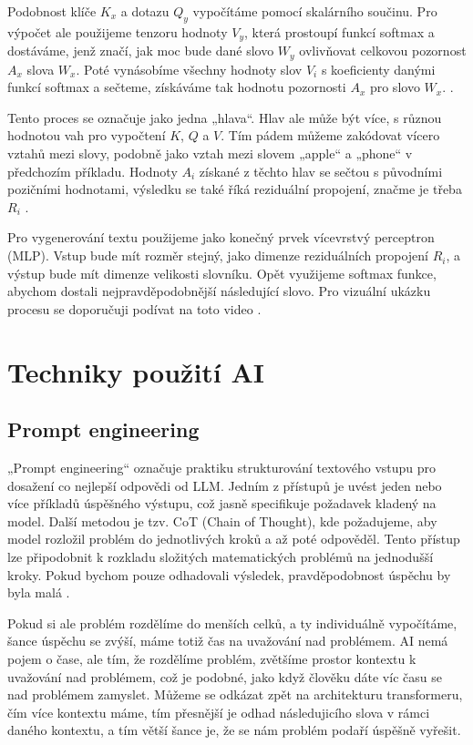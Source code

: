 \documentclass[FM,DP]{tulthesis}
\begin{document}
		Podobnost klíče $K_x$ a dotazu $Q_y$ vypočítáme pomocí skalárního součinu. Pro výpočet ale použijeme tenzoru hodnoty $V_y$, která prostoupí funkcí softmax a dostáváme, jenž značí, jak moc bude dané slovo $W_y$ ovlivňovat celkovou pozornost $A_x$ slova $W_x$. Poté vynásobíme všechny hodnoty slov $V_i$ s koeficienty danými funkcí softmax a sečteme, získáváme tak hodnotu pozornosti $A_x$ pro slovo $W_x$. \cite{vaswani2023attention} \cite{rothman2021transformers}.
		
		Tento proces se označuje jako jedna „hlava“. Hlav ale může být více, s různou hodnotou vah pro vypočtení $K$, $Q$ a $V$. Tím pádem můžeme zakódovat vícero vztahů mezi slovy, podobně jako vztah mezi slovem „apple“ a „phone“ v předchozím příkladu. Hodnoty $A_i$ získané z těchto hlav se sečtou s původními pozičními hodnotami, výsledku se také říká reziduální propojení, značme je třeba $R_i$ \cite{vaswani2023attention} \cite{rothman2021transformers}.
		
		Pro vygenerování textu použijeme jako konečný prvek vícevrstvý perceptron (MLP). Vstup bude mít rozměr stejný, jako dimenze reziduálních propojení $R_i$, a výstup bude mít dimenze velikosti slovníku. Opět využijeme softmax funkce, abychom dostali nejpravděpodobnější následující slovo. Pro vizuální ukázku procesu se doporučuji podívat na toto video \cite{ytb:transformers} \cite{vaswani2023attention} \cite{rothman2021transformers}.
		
		\section{Techniky použití AI} 
		\subsection{Prompt engineering}
		„Prompt engineering“ označuje praktiku strukturování textového vstupu pro dosažení co nejlepší odpovědi od LLM. Jedním z přístupů je uvést jeden nebo více příkladů úspěšného výstupu, což jasně specifikuje požadavek kladený na model. Další metodou je tzv. CoT (Chain of Thought), kde požadujeme, aby model rozložil problém do jednotlivých kroků a až poté odpověděl. Tento přístup lze připodobnit k rozkladu složitých matematických problémů na jednodušší kroky. Pokud bychom pouze odhadovali výsledek, pravděpodobnost úspěchu by byla malá \cite{PEG}. 

Pokud si ale problém rozdělíme do menších celků, a ty individuálně vypočítáme, šance úspěchu se zvýší, máme totiž čas na uvažování nad problémem. AI nemá pojem o čase, ale tím, že rozdělíme problém, zvětšíme prostor kontextu k uvažování nad problémem, což je podobné, jako když člověku dáte víc času se nad problémem zamyslet. Můžeme se odkázat zpět na architekturu transformeru, čím více kontextu máme, tím přesnější je odhad následujicího slova v rámci daného kontextu, a tím větší šance je, že se nám problém podaří úspěšně vyřešit.
		
\end{document}
